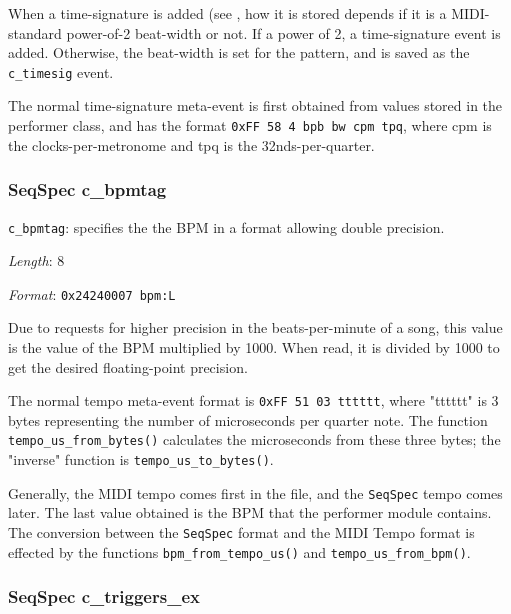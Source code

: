    When a time-signature is added
   (see ,
   how it is stored depends if it is a MIDI-standard power-of-2 beat-width or
   not.  If a power of 2, a time-signature event is added.
   Otherwise, the beat-width is set for the pattern, and is saved as the
   \texttt{c\_timesig} event.

   The normal time-signature meta-event is first obtained from values stored in
   the performer class, and has the format
   \texttt{0xFF 58 4 bpb bw cpm tpq}, where cpm is the clocks-per-metronome
   and tpq is the 32nds-per-quarter.

\subsubsection{SeqSpec c\_bpmtag}
\label{subsubsec:midi_format_track_seqspec_bpmtag}


   \begin{description}
      \item \texttt{c\_bpmtag}: specifies the the BPM in a format allowing double
         precision.
      \item \textsl{Length}: 8
      \item \textsl{Format}: \texttt{0x24240007 bpm:L}
   \end{description}

   Due to requests for higher precision in the beats-per-minute of a song, this
   value is the value of the BPM multiplied by 1000.
   When read, it is divided by 1000 to get the desired floating-point precision.

   The normal tempo meta-event format is
   \texttt{0xFF 51 03 tttttt}, where "tttttt" is 3 bytes representing the number
   of microseconds per quarter note.
   The function \texttt{tempo\_us\_from\_bytes()} calculates the microseconds
   from these three bytes; the "inverse" function is
   \texttt{tempo\_us\_to\_bytes()}.

   Generally, the MIDI tempo comes first in the file, and the
   \texttt{SeqSpec} tempo comes later.
   The last value obtained is the BPM that the performer module contains.
   The conversion between the
   \texttt{SeqSpec} format and the MIDI Tempo format is
   effected by the functions
   \texttt{bpm\_from\_tempo\_us()} and \texttt{tempo\_us\_from\_bpm()}.

\subsubsection{SeqSpec c\_triggers\_ex}
\label{subsubsec:midi_format_track_seqspec_triggers_ex}

